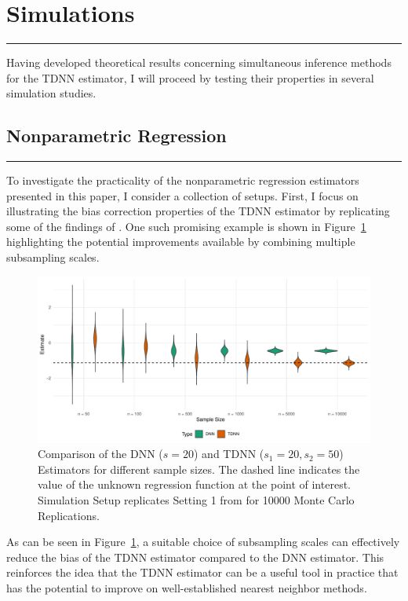 \section{Simulations}\label{sec:simulations}
\hrule

Having developed theoretical results concerning simultaneous inference methods for the TDNN estimator, I will proceed by testing their properties in several simulation studies.

\subsection{Nonparametric Regression}
\hrule
To investigate the practicality of the nonparametric regression estimators presented in this paper, I consider a collection of setups.
First, I focus on illustrating the bias correction properties of the TDNN estimator by replicating some of the findings of \citet{demirkaya_optimal_2024}.
One such promising example is shown in Figure~\ref{fig:TDNN_bias_cor} highlighting the potential improvements available by combining multiple subsampling scales.
\begin{figure}[H]
	\centering
	\includegraphics[width = \textwidth]{../Code/Simulations/Graphics/TDNN_DNN.pdf}
	\caption{Comparison of the DNN ($s = 20$) and TDNN ($s_1 = 20, s_2 = 50$) Estimators for different sample sizes.
		The dashed line indicates the value of the unknown regression function at the point of interest.
		Simulation Setup replicates Setting 1 from \citet{demirkaya_optimal_2024} for 10000 Monte Carlo Replications.}
	\label{fig:TDNN_bias_cor}
\end{figure}
As can be seen in Figure~\ref{fig:TDNN_bias_cor}, a suitable choice of subsampling scales can effectively reduce the bias of the TDNN estimator compared to the DNN estimator.
This reinforces the idea that the TDNN estimator can be a useful tool in practice that has the potential to improve on well-established nearest neighbor methods.

